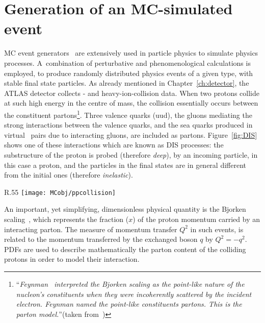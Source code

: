 	\section{Generation of an MC-simulated event}
	\label{sec:evGen}

		\ac{MC} event generators~\cite{Buckley:2011ms} are extensively used in particle physics to simulate physics processes. A combination of perturbative and phenomenological calculations is employed, to produce randomly distributed physics events of a given type, with stable final state particles. As already mentioned in Chapter~\ref{ch:detector}, the \ac{ATLAS} detector collects \pp- and heavy-ion-collision data. When two protons collide at such high energy in the centre of mass, the collision essentially occurs between the constituent partons\footnote{``\emph{Feynman~\cite{PhysRevLett.23.1415} interpreted the Bjorken scaling as the point-like nature of the nucleon's constituents when they were incoherently scattered by the incident electron. Feynman named the point-like constituents partons. This is the parton model.}''(taken from~\cite{Yan:2014kna})}. Three valence quarks (uud), the gluons mediating the strong interactions between the valence quarks, and the sea quarks produced in virtual \qqbar\ pairs due to interacting gluons, are included as partons. Figure~\ref{fig:DIS} shows one of these interactions which are known as \ac{DIS} processes: the substructure of the proton is probed (therefore \emph{deep}), by an incoming particle, in this case a proton, and the particles in the final states are in general different from the initial ones (therefore \emph{inelastic}).

		\begin{wrapfigure}{R}{.55\textwidth}
			\centering\texttt{[image: MCobj/ppcollision]}
			\caption{\label{fig:DIS} Example of a \pp\ \ac{DIS} event.}
		\end{wrapfigure}
		
		An important, yet simplifying, dimensionless physical quantity is the Bjorken scaling~\cite{PhysRev.179.1547}, which represents the fraction ($x$) of the proton momentum carried by an interacting parton. The measure of momentum transfer $Q^2$ in such events, is related to the momentum transferred by the exchanged boson $q$ by $Q^2 = -q^2$. \acp{PDF} are used to describe mathematically the parton content of the colliding protons in order to model their interaction.  

